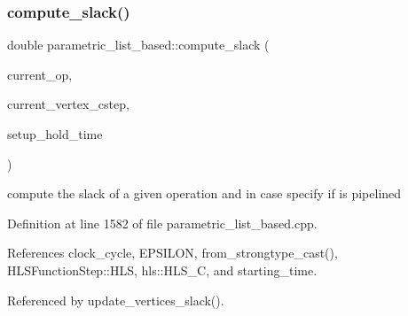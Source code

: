 \subsubsection{\texorpdfstring{compute\+\_\+slack()}{compute\_slack()}}
{\footnotesize\ttfamily double parametric\+\_\+list\+\_\+based\+::compute\+\_\+slack (\begin{DoxyParamCaption}\item[{\hyperlink{graph_8hpp_abefdcf0544e601805af44eca032cca14}{vertex}}]{current\+\_\+op,  }\item[{const Control\+Step}]{current\+\_\+vertex\+\_\+cstep,  }\item[{double}]{setup\+\_\+hold\+\_\+time }\end{DoxyParamCaption})\hspace{0.3cm}{\ttfamily [private]}}



compute the slack of a given operation and in case specify if is pipelined 



Definition at line 1582 of file parametric\+\_\+list\+\_\+based.\+cpp.



References clock\+\_\+cycle, E\+P\+S\+I\+L\+ON, from\+\_\+strongtype\+\_\+cast(), H\+L\+S\+Function\+Step\+::\+H\+LS, hls\+::\+H\+L\+S\+\_\+C, and starting\+\_\+time.



Referenced by update\+\_\+vertices\+\_\+slack().

